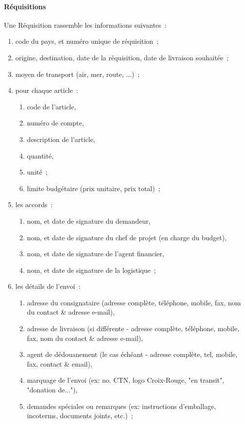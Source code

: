 \paragraph{Réquisitions}
Une Réquisition rassemble les informations suivantes~:
\begin{enumerate}
	\item code du pays, et numéro unique de réquisition~;
	\item origine, destination, date de la réquisition, date de livraison souhaitée~;
	\item moyen de transport (air, mer, route, ...)~;
	\item pour chaque article~:
	\begin{enumerate}
		\item code de l'article,
		\item numéro de compte,
		\item description de l'article,
		\item quantité,
		\item unité~;
		\item limite budgétaire (prix unitaire, prix total)~;
	\end{enumerate}
	\item les accords~:
	\begin{enumerate}
		\item nom, et date de signature du demandeur,
		\item nom, et date de signature du  chef de projet (en charge du budget),
		\item nom, et date de signature de l'agent financier,
		\item nom, et date de signature de la logistique~;
	\end{enumerate}
	\item les détails de l'envoi~:
	\begin{enumerate}
		\item adresse du consignataire (adresse complète, téléphone, mobile, fax, nom du contact \& adresse e-mail),
		\item adresse de livraison (si différente - adresse complète, téléphone, mobile, fax, nom du contact \& adresse e-mail),
		\item agent de dédouanement (le cas échéant - adresse complète, tel, mobile, fax, contact \& email),
		\item marquage de l'envoi (ex: no. CTN, logo Croix-Rouge, "en transit", "donation de..."),
		\item demandes spéciales ou remarques (ex: instructions d'emballage, incoterms, documents joints, etc.)~;
	\end{enumerate}
\end{enumerate}

